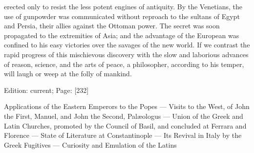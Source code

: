 erected only to resist the less potent engines of antiquity. By the Venetians, the use of gunpowder was communicated without reproach to the sultans of Egypt and Persia, their allies against the Ottoman power. The secret was soon propagated to the extremities of Asia; and the advantage of the European was confined to his easy victories over the savages of the new world. If we contrast the rapid progress of this mischievous discovery with the slow and laborious advances of reason, science, and the arts of peace, a philosopher, according to his temper, will laugh or weep at the folly of mankind.

Edition: current; Page: [232]


Applications of the Eastern Emperors to the Popes \texthebrew{—} Visits to the West, of John the First, Manuel, and John the Second, Palæologus \texthebrew{—} Union of the Greek and Latin Churches, promoted by the Council of Basil, and concluded at Ferrara and Florence \texthebrew{—} State of Literature at Constantinople \texthebrew{—} Its Revival in Italy by the Greek Fugitives \texthebrew{—} Curiosity and Emulation of the Latins

